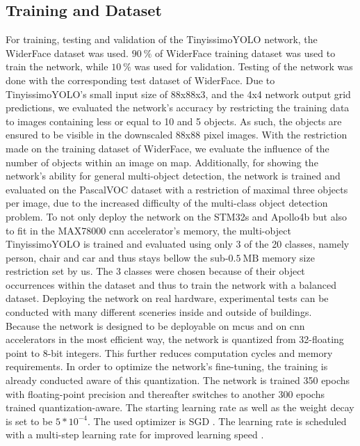 \documentclass[conference]{IEEEtran}
\begin{document}
\subsection{Training and Dataset}
For training, testing and validation of the TinyissimoYOLO network, the WiderFace dataset  \cite{yang_wider_2016} was used. $\SI{90}{\percent}$ of WiderFace training dataset was used to train the network, while $\SI{10}{\percent}$ was used for validation. Testing of the network was done with the corresponding test dataset of WiderFace. Due to TinyissimoYOLO's small input size of 88x88x3, and the 4x4 network output grid predictions, we evaluated the network's accuracy by restricting the training data to images containing less or equal to 10 and 5 objects. As such, the objects are ensured to be visible in the downscaled 88x88 pixel images. With the restriction made on the training dataset of WiderFace, we evaluate the influence of the number of objects within an image on \gls{map}. Additionally, for showing the network's ability for general multi-object detection, the network is trained and evaluated on the PascalVOC dataset \cite{everingham_pascal_2015} with a restriction of maximal three objects per image, due to the increased difficulty of the multi-class object detection problem. To not only deploy the network on the STM32s and Apollo4b but also to fit in the MAX78000 \gls{cnn} accelerator's memory, the multi-object TinyissimoYOLO is trained and evaluated using only 3 of the 20 classes, namely person, chair and car and thus stays bellow the sub-$\SI{0.5}{\text{MB}}$ memory size restriction set by us.
The 3 classes were chosen because of their object occurrences within the dataset and thus to train the network with a balanced dataset. Deploying the network on real hardware, experimental tests can be conducted with many different sceneries inside and outside of buildings. \\
Because the network is designed to be deployable on \glspl{mcu} and on \gls{cnn} accelerators in the most efficient way, the network is quantized from 32-floating point to 8-bit integers. This further reduces computation cycles and memory requirements. In order to optimize the network's fine-tuning, the training is already conducted aware of this quantization. 
The network is trained 350 epochs with floating-point precision and thereafter switches to another 300 epochs trained quantization-aware. The starting learning rate as well as the weight decay is set to be $5*10^{-4}$. The used optimizer is SGD \cite{saad_-line_1999}. The learning rate is scheduled with a multi-step learning rate for improved learning speed \cite{goyal_accurate_2018}.
\end{document}
